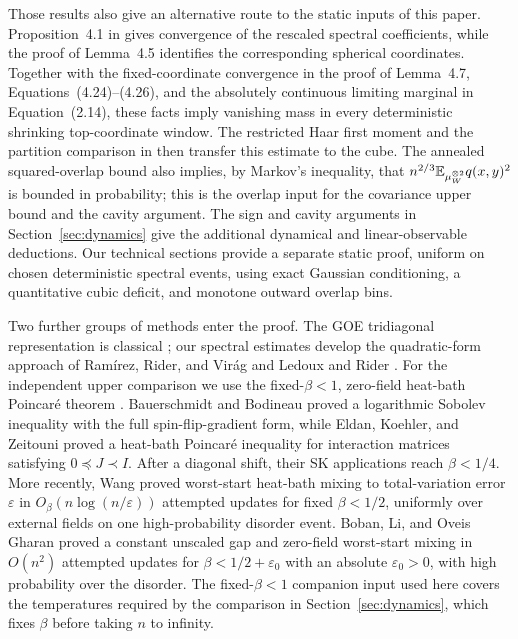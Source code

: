 Those results also give an alternative route to the static inputs of
this paper. Proposition~4.1 in \cite{duHuang2026Overlap} gives convergence
of the rescaled spectral coefficients, while the proof of Lemma~4.5
identifies the corresponding spherical coordinates. Together with the
fixed-coordinate convergence in the proof of Lemma~4.7,
Equations~(4.24)--(4.26), and the absolutely continuous limiting marginal
in Equation~(2.14), these facts imply
vanishing mass in every deterministic shrinking top-coordinate window.
The restricted Haar first moment and the partition comparison in
\cite[Theorem~1.6]{duHuang2026FreeEnergy} then transfer this estimate to
the cube. The annealed squared-overlap bound also implies, by Markov's inequality, that
$n^{2/3}\mathbb E_{\mu_W^{\otimes2}}q(x,y)^2$ is bounded in probability; this is
the overlap input for the covariance upper bound and the cavity argument.
The sign and cavity arguments in Section~\ref{sec:dynamics} give the
additional dynamical and linear-observable deductions.
Our technical sections provide a separate static proof, uniform on
chosen deterministic spectral events, using exact Gaussian conditioning,
a quantitative cubic deficit, and monotone outward overlap bins.

Two further groups of methods enter the proof. The GOE tridiagonal
representation is classical \cite{dumitriuEdelman2002}; our spectral
estimates develop the quadratic-form approach of Ram\'irez, Rider, and
Vir\'ag \cite{ramirezRiderVirag2011} and Ledoux and Rider
\cite{ledouxRider2010}. For the independent upper comparison we use the
fixed-$\beta<1$, zero-field heat-bath Poincar\'e theorem
\cite[Theorem~1.1]{skgapcompanion}. Bauerschmidt and Bodineau
\cite{bauerschmidtBodineau2019} proved a logarithmic Sobolev inequality
with the full spin-flip-gradient form, while Eldan, Koehler, and Zeitouni
\cite{eldanKoehlerZeitouni2022} proved a heat-bath Poincar\'e inequality
for interaction matrices satisfying $0\preceq J\prec I$. After a diagonal shift, their SK applications
reach $\beta<1/4$. More recently, Wang \cite{wang2026SKMixing} proved
worst-start heat-bath mixing to total-variation error $\varepsilon$ in
$O_\beta(n\log(n/\varepsilon))$ attempted updates for fixed $\beta<1/2$,
uniformly over external fields on one
high-probability disorder event. Boban, Li, and Oveis Gharan
\cite{bobanLiOveisGharan2026SK} proved a constant unscaled gap and
zero-field worst-start mixing in $O(n^2)$ attempted updates for $\beta<1/2+\varepsilon_0$
with an absolute $\varepsilon_0>0$, with high probability over the disorder.
The fixed-$\beta<1$ companion input
used here covers the temperatures required by the comparison in
Section~\ref{sec:dynamics}, which fixes $\beta$ before taking $n$ to infinity.

